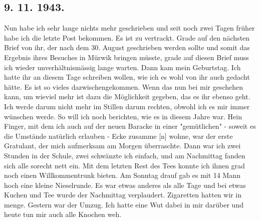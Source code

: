 \subsection{9. 11. 1943.}

Nun habe ich sehr lange nichts mehr geschrieben und seit noch zwei Tagen fr\"{u}her habe ich die letzte Post bekommen.
Es ist zu vertrackt.
Grade auf den n\"{a}chsten Brief von ihr, der nach dem 30. August geschrieben werden sollte und somit das Ergebnis ihres Besuches in M\"{u}rwik bringen m\"{u}sste, grade auf diesen Brief muss ich wieder unverh\"{a}ltnism\"{a}ssig lange warten.
Dann kam mein Geburtstag.
Ich hatte ihr an diesem Tage schreiben wollen, wie ich es wohl von ihr auch gedacht h\"{a}tte.
Es ist so vieles dazwischengekommen.
Wenn das nun bei mir geschehen kann, um wieviel mehr ist dazu die M\"{o}glichkeit gegeben, das es ihr ebenso geht.
Ich werde darum nicht mehr im Stillen darum rechten, obwohl ich es mir immer w\"{u}nschen werde.
So will ich noch berichten, wie es in diesem Jahre war.
Hein Finger, mit dem ich auch auf der neuen Baracke in einer "gem\"{u}tlichen" - soweit es die Umst\"{a}nde nat\"{u}rlich erlauben - Ecke zusamme{\color{red} [n] }wohne, war der erste Gratulant, der mich aufmerksam am Morgen \"{u}berraschte.
Dann war ich zwei Stunden in der Schule, zwei schw\"{a}nzte ich einfach, und am Nachmittag fanden sich alle sorecht nett ein.
Mit dem letzten Rest des Tees konnte ich ihnen grad noch einen Willkommentrunk bieten.
Am Sonntag drauf gab es mit 14 Mann hoch eine kleine Nieselrunde.
Es war etwas anderes als alle Tage und bei etwas Kuchen und Tee wurde der Nachmittag verplaudert.
Zigaretten hatten wir in menge.
Gestern war der Umzug.
Ich hatte eine Wut dabei in mir dar\"{u}ber und heute tun mir auch alle Knochen weh.

\clearpage
